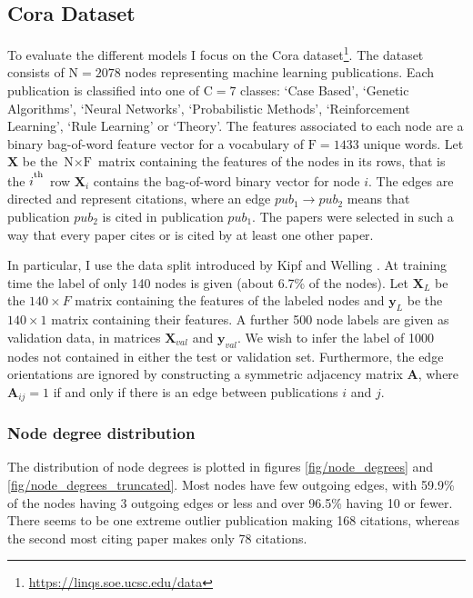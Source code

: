 \documentclass[12pt]{article}
\theoremstyle{definition}
\begin{document}
\subsection{Cora Dataset}
To evaluate the different models I focus on the Cora \cite{cora} dataset\footnote{\url{https://linqs.soe.ucsc.edu/data}}. The dataset consists of $\textrm{N} = 2078$ nodes representing machine learning publications. Each publication is classified into one of $\textrm{C} = 7$ classes: `Case Based', `Genetic Algorithms', `Neural Networks', `Probabilistic Methods', `Reinforcement Learning', `Rule Learning' or `Theory'. The features associated to each node are a binary bag-of-word feature vector for a vocabulary of $\textrm{F} = 1433$ unique words. Let $\mathbf{X}$ be the $\textrm{N} \times \textrm{F}$ matrix containing the features of the nodes in its rows, that is the $i^\textsuperscript{th}$ row  $\mathbf{X}_i$ contains the bag-of-word binary vector for node $i$. The edges are directed and represent citations, where an edge $\mathit{pub_1} \to \mathit{pub_2}$ means that publication $\mathit{pub_2}$ is cited in publication $\mathit{pub_1}$. The papers were selected in such a way that every paper cites or is cited by at least one other paper.

\bigskip

In particular, I use the data split introduced by Kipf and Welling \cite{kipf2017semi}. At training time the label of only 140 nodes is given (about 6.7\% of the nodes). Let $\mathbf{X}_{L}$ be the $140 \times F$ matrix containing the features of the labeled nodes and $\textbf{y}_L$ be the $140 \times 1$ matrix containing their features. A further 500 node labels are given as validation data, in matrices $\mathbf{X}_{\textit{val}}$ and $\textbf{y}_{\textit{val}}$. We wish to infer the label of 1000 nodes not contained in either the test or validation set. Furthermore, the edge orientations are ignored by constructing a symmetric adjacency matrix $\mathbf{A}$, where $\mathbf{A}_{ij} = 1$ if and only if there is an edge between publications $i$ and $j$.

\subsubsection{Node degree distribution}
The distribution of node degrees is plotted in figures \ref{fig/node_degrees} and \ref{fig/node_degrees_truncated}. Most nodes have few outgoing edges, with 59.9\% of the nodes having 3 outgoing edges or less and over 96.5\% having 10 or fewer. There seems to be one extreme outlier publication making 168 citations, whereas the second most citing paper makes only 78 citations.
\end{document}
